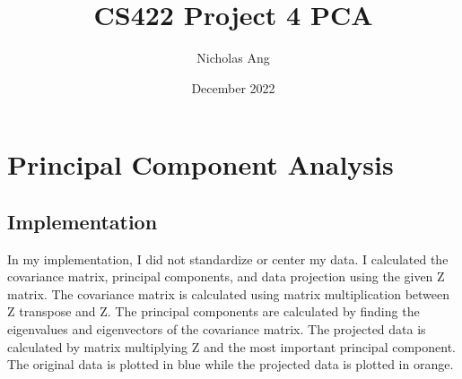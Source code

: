 \documentclass{article}
\title{CS422 Project 4 PCA}
\author{Nicholas Ang}
\date{December 2022}
\begin{document}
\maketitle
\clearpage
\section*{Principal Component Analysis}
\subsection*{Implementation}
In my implementation, I did not standardize or center my data. I calculated the covariance matrix, principal components, and data projection using the given Z matrix. The covariance matrix is calculated using matrix multiplication between Z transpose and Z. The principal components are calculated by finding the eigenvalues and eigenvectors of the covariance matrix. The projected data is calculated by matrix multiplying Z and the most important principal component. The original data is plotted in blue while the projected data is plotted in orange. 
\end{document}
